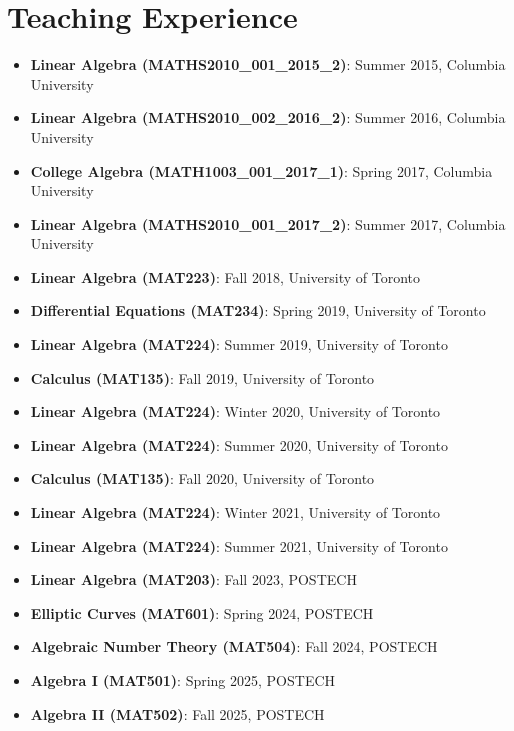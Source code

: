 \documentclass[a4paper,10pt]{article}
\begin{document}
\section*{Teaching Experience}
\begin{itemize}
    \item \textbf{Linear Algebra (MATHS2010\_001\_2015\_2)}: Summer 2015, Columbia University
    \item \textbf{Linear Algebra (MATHS2010\_002\_2016\_2)}: Summer 2016, Columbia University
    \item \textbf{College Algebra (MATH1003\_001\_2017\_1)}: Spring 2017, Columbia University
    \item \textbf{Linear Algebra (MATHS2010\_001\_2017\_2)}: Summer 2017, Columbia University
    \item \textbf{Linear Algebra (MAT223)}: Fall 2018, University of Toronto
    \item \textbf{Differential Equations (MAT234)}: Spring 2019, University of Toronto
    \item \textbf{Linear Algebra (MAT224)}: Summer 2019, University of Toronto
    \item \textbf{Calculus (MAT135)}: Fall 2019, University of Toronto
    \item \textbf{Linear Algebra (MAT224)}: Winter 2020, University of Toronto
    \item \textbf{Linear Algebra (MAT224)}: Summer 2020, University of Toronto
    \item \textbf{Calculus (MAT135)}: Fall 2020, University of Toronto
    \item \textbf{Linear Algebra (MAT224)}: Winter 2021, University of Toronto
    \item \textbf{Linear Algebra (MAT224)}: Summer 2021, University of Toronto
    \item \textbf{Linear Algebra (MAT203)}: Fall 2023, POSTECH
    \item \textbf{Elliptic Curves (MAT601)}: Spring 2024, POSTECH
    \item \textbf{Algebraic Number Theory (MAT504)}: Fall 2024, POSTECH
    \item \textbf{Algebra I (MAT501)}: Spring 2025, POSTECH
    \item \textbf{Algebra II (MAT502)}: Fall 2025, POSTECH
\end{itemize}
\end{document}

